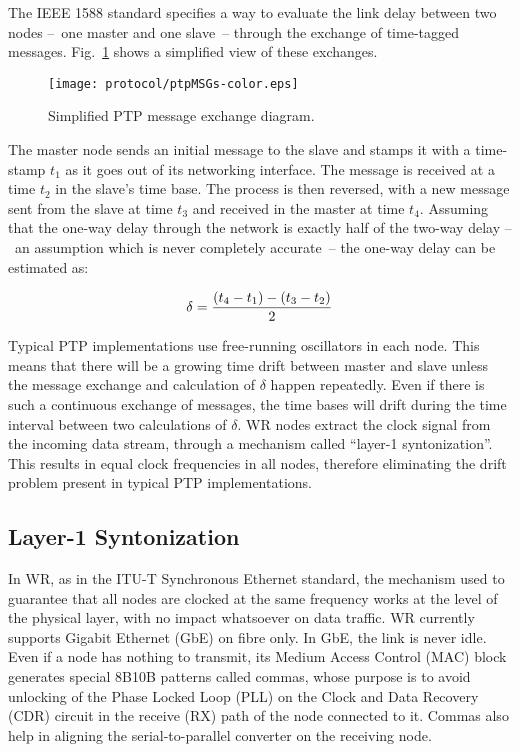 \documentclass{../JAC2003}
\begin{document}
The IEEE 1588 standard specifies a way to evaluate the link delay
between two nodes --~one master and one slave~-- through the exchange
of time-tagged messages. Fig.~\ref{ptp-fig} shows a simplified view of
these exchanges.

\begin{figure}[htb]
   \centering
   \texttt{[image: protocol/ptpMSGs-color.eps]}
   \caption{Simplified PTP message exchange diagram.}
   \label{ptp-fig}
\end{figure}

The master node sends an initial message to the slave and stamps it with
a time-stamp $t_1$ as it goes out of its networking interface. The
message is received at a time $t_2$ in the slave's time base. The
process is then reversed, with a new message sent from the slave at
time $t_3$ and received in the master at time $t_4$. Assuming that the
one-way delay through the network is exactly half of the two-way delay
--~an assumption which is never completely accurate~-- the one-way
delay can be estimated as:

\begin{equation}\label{ptp-eq}
    \delta={{(t_4 - t_1) - (t_3 - t_2)} \over 2} 
\end{equation}

Typical PTP implementations use free-running oscillators in each
node. This means that there will be a growing time drift between
master and slave unless the message exchange and calculation of
$\delta$ happen repeatedly. Even if there is such a continuous
exchange of messages, the time bases will drift during the time
interval between two calculations of $\delta$. WR nodes extract the
clock signal from the incoming data stream, through a mechanism called
``layer-1 syntonization''. This results in equal clock frequencies in
all nodes, therefore eliminating the drift problem present in typical
PTP implementations.

\subsection{Layer-1 Syntonization}

In WR, as in the ITU-T Synchronous Ethernet standard, the mechanism
used to guarantee that all nodes are clocked at the same frequency
works at the level of the physical layer, with no impact whatsoever on
data traffic. WR currently supports Gigabit Ethernet (GbE) on fibre
only. In GbE, the link is never idle. Even if a node has nothing to
transmit, its Medium Access Control (MAC) block generates special
8B10B patterns called commas, whose purpose is to avoid unlocking of the Phase
Locked Loop (PLL) on the Clock and Data Recovery (CDR) circuit in the
receive (RX) path of the node connected to it. Commas also help in aligning the
serial-to-parallel converter on the receiving node. 
\end{document}
